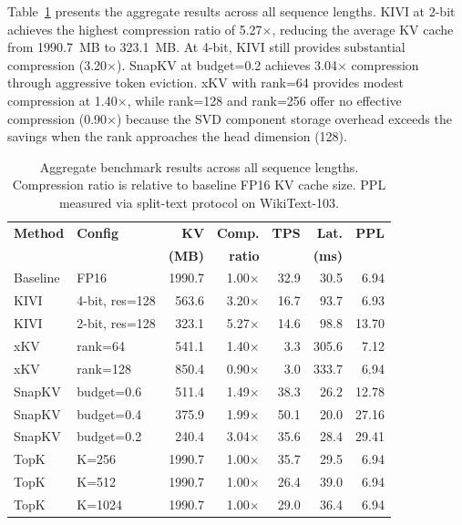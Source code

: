 \documentclass[conference]{IEEEtran}
\begin{document}
Table~\ref{tab:main_results} presents the aggregate results across all sequence lengths. KIVI at 2-bit achieves the highest compression ratio of 5.27$\times$, reducing the average KV cache from 1990.7~MB to 323.1~MB. At 4-bit, KIVI still provides substantial compression (3.20$\times$). SnapKV at budget=0.2 achieves 3.04$\times$ compression through aggressive token eviction. xKV with rank=64 provides modest compression at 1.40$\times$, while rank=128 and rank=256 offer no effective compression (0.90$\times$) because the SVD component storage overhead exceeds the savings when the rank approaches the head dimension (128).

\begin{table}[t]
\centering
\caption{Aggregate benchmark results across all sequence lengths. Compression ratio is relative to baseline FP16 KV cache size. PPL measured via split-text protocol on WikiText-103.}
\label{tab:main_results}
\begin{tabular}{@{}llrrrrr@{}}
\toprule
\textbf{Method} & \textbf{Config} & \textbf{KV} & \textbf{Comp.} & \textbf{TPS} & \textbf{Lat.} & \textbf{PPL} \\
 & & \textbf{(MB)} & \textbf{ratio} & & \textbf{(ms)} & \\
\midrule
Baseline & FP16 & 1990.7 & 1.00$\times$ & 32.9 & 30.5 & 6.94 \\
\midrule
KIVI & 4-bit, res=128 & 563.6 & 3.20$\times$ & 16.7 & 93.7 & 6.93 \\
KIVI & 2-bit, res=128 & 323.1 & 5.27$\times$ & 14.6 & 98.8 & 13.70 \\
\midrule
xKV & rank=64 & 541.1 & 1.40$\times$ & 3.3 & 305.6 & 7.12 \\
xKV & rank=128 & 850.4 & 0.90$\times$ & 3.0 & 333.7 & 6.94 \\
\midrule
SnapKV & budget=0.6 & 511.4 & 1.49$\times$ & 38.3 & 26.2 & 12.78 \\
SnapKV & budget=0.4 & 375.9 & 1.99$\times$ & 50.1 & 20.0 & 27.16 \\
SnapKV & budget=0.2 & 240.4 & 3.04$\times$ & 35.6 & 28.4 & 29.41 \\
\midrule
TopK & K=256 & 1990.7 & 1.00$\times$ & 35.7 & 29.5 & 6.94 \\
TopK & K=512 & 1990.7 & 1.00$\times$ & 26.4 & 39.0 & 6.94 \\
TopK & K=1024 & 1990.7 & 1.00$\times$ & 29.0 & 36.4 & 6.94 \\
\bottomrule
\end{tabular}
\end{table}
\end{document}
